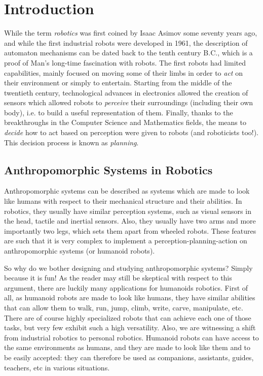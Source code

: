 \chapter{Introduction}
\label{chap:chap0}

While the term \emph{robotics} was first coined by Isaac Asimov some
seventy years ago, and while the first industrial robots were
developed in 1961, the description of automaton mechanisms can
be dated back to the tenth century B.C., which is a proof of Man's
long-time fascination with robots. The first robots had limited
capabilities, mainly focused on moving some of their limbs in order to
\emph{act} on their environment or simply to entertain. Starting from
the middle of the twentieth century, technological advances in
electronics allowed the creation of sensors which allowed robots to
\emph{perceive} their surroundings (including their own body), i.e. to
build a useful representation of them. Finally, thanks to the
breakthroughs in the Computer Science and Mathematics fields, the
means to \emph{decide} how to act based on perception were given to
robots (and roboticists too!). This decision process is known as
\emph{planning}.

\section{Anthropomorphic Systems in Robotics}

Anthropomorphic systems can be described as systems which are made to
look like humans with respect to their mechanical structure and their
abilities. In robotics, they usually have similar perception systems,
such as visual sensors in the head, tactile and inertial
sensors. Also, they usually have two arms and more importantly two
legs, which sets them apart from wheeled robots. These features are
such that it is very complex to implement a perception-planning-action
on anthropomorphic systems (or humanoid robots).

So why do we bother designing and studying anthropomorphic systems?
Simply because it is fun! As the reader may still be skeptical with
respect to this argument, there are luckily many applications for
humanoids robotics. First of all, as humanoid robots are made to look
like humans, they have similar abilities that can allow them to walk,
run, jump, climb, write, carve, manipulate, etc. There are of course
highly specialized robots that can achieve each one of those tasks,
but very few exhibit such a high versatility. Also, we are witnessing
a shift from industrial robotics to personal robotics. Humanoid robots
can have access to the same environments as humans, and they are made
to look like them and to be easily accepted: they can therefore be
used as companions, assistants, guides, teachers, etc in various
situations.


